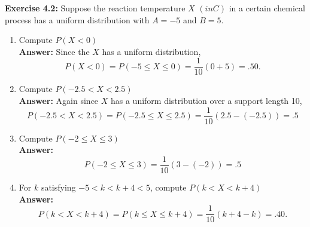 \documentclass[12pt]{article}
\theoremstyle{homework}
\begin{document}
\hspace{.5in}\textbf{Exercise 4.2:} Suppose the reaction temperature $X$ 
$(in C)$ in a certain chemical process has a uniform distribution with  $A = -5$ and $B = 5$.\\
\begin{enumerate}
  
  
  
  
  \item Compute $P(X<0)$\\
  
  \textbf{Answer:} Since the $X$ has a uniform distribution,
  \begin{equation*}
    P(X<0) = P(-5\le X \le 0) = \dfrac{1}{10}(0 + 5) = .50.
  \end{equation*}
  \vspace{.25in}
  
  
  
  
  
  \item Compute $P(-2.5 < X < 2.5)$\\
  
  \textbf{Answer:} Again since $X$ has a uniform distribution over a support length 10,
  \begin{equation*}
    P(-2.5 < X < 2.5) = P(-2.5 \le X \le 2.5) = \dfrac{1}{10}(2.5 - (-2.5)) = .5
  \end{equation*}
  \vspace{.25in}
  
  
  
  \item Compute $P(-2 \le X \le 3)$\\
  
  \textbf{Answer:} 
  \begin{equation*}
    P(-2 \le X \le 3) = \dfrac{1}{10}(3 - (-2)) = .5
  \end{equation*}
  \vspace{.25in}
  
  
  
  \item For $k$ satisfying $-5<k<k+4<5$, compute $P(k<X<k+4)$\\
  
  \textbf{Answer:} 
  \begin{equation*}
    P(k<X<k+4) = P(k \le X \le k+4) = \dfrac{1}{10}(k + 4 - k) = .40. 
  \end{equation*}
  
\end{enumerate}
\end{document}
